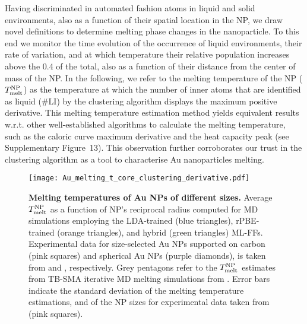 \documentclass[%
aip,
 amsmath,amssymb,
 reprint,
]{revtex4-1}
\newcommand*\subt[1]{_{\textnormal{#1}}}
\newcommand*\supt[1]{^{\textnormal{#1}}}
\begin{document}
Having discriminated in automated fashion atoms in liquid and solid environments, also as a function of their spatial location in the NP, we draw novel definitions to determine melting phase changes in the nanoparticle.
%
To this end we monitor the time evolution of the occurrence of liquid environments, their rate of variation, and at which temperature their relative population increases above the 0.4 of the total, also as a function of their distance from the center of mass of the NP.
%
In the following, we refer to the melting temperature of the NP ($T\subt{melt}\supt{NP}$) as the temperature at which the number of inner atoms that are identified as liquid (\#LI) by the clustering algorithm displays the maximum positive derivative.
%
This melting temperature estimation method yields equivalent results w.r.t. other well-established algorithms to calculate the melting temperature, such as the caloric curve maximum derivative and the heat capacity peak (see Supplementary Figure~13). 
%
This observation further corroborates our trust in the clustering algorithm as a tool to characterise Au nanoparticles melting.
%
\begin{figure}[b!]
    \centering
    \texttt{[image: Au\_melting\_t\_core\_clustering\_derivative.pdf]}
    \caption{
    \textbf{Melting temperatures of Au NPs of different sizes.}
    Average $T\subt{melt}\supt{NP}$ as a function of NP's reciprocal radius computed for MD simulations employing the LDA-trained (blue triangles), rPBE-trained (orange triangles), and hybrid (green triangles) ML-FFs.
    Experimental data for size-selected Au NPs supported on carbon (pink squares) and spherical Au NPs (purple diamonds), is taken from \citet{Foster2019} and \citet{duan2018influence}, respectively.
    Grey pentagons refer to the $T\subt{melt}\supt{NP}$ estimates from TB-SMA iterative MD melting simulations from \citet{Delgado-Callico2020}.
    Error bars indicate the standard deviation of the melting temperature estimations, and of the NP sizes for experimental data taken from \citet{Foster2019} (pink squares).
}
    \label{fig:melting_temperature}
\end{figure}
%
\end{document}

